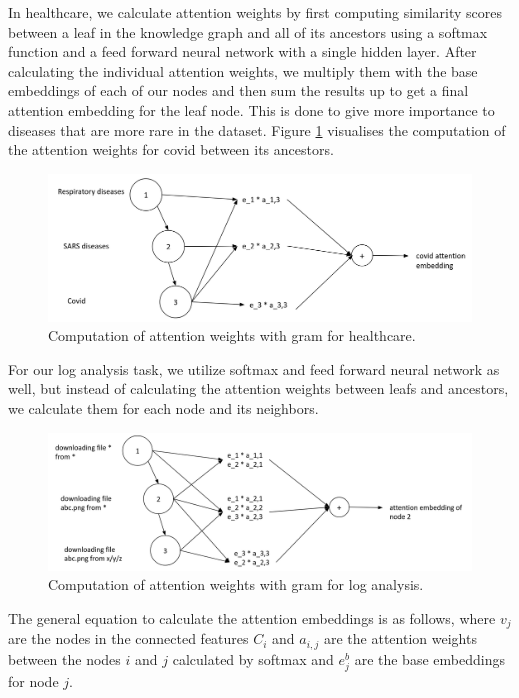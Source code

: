 In healthcare, we calculate attention weights by first computing similarity scores between a leaf in the knowledge graph and all of its ancestors using a softmax function and a feed forward neural network with a single hidden layer. After calculating the individual attention weights, we multiply them with the base embeddings of each of our nodes and then sum the results up to get a final attention embedding for the leaf node. This is done to give more importance to diseases that are more rare in the dataset. Figure \ref{fig:gramAttention} visualises the computation of the attention weights for covid between its ancestors. 

\begin{figure}[H]
    \centering
    \includegraphics[keepaspectratio=true,scale=0.3]{sections/gram_attention.png}
    \caption{Computation of attention weights with gram for healthcare. }
    \label{fig:gramAttention}
\end{figure}

For our log analysis task, we utilize softmax and feed forward neural network as well, but instead of calculating the attention weights between leafs and ancestors, we calculate them for each node and its neighbors. 

\begin{figure}[H]
    \centering
    \includegraphics[keepaspectratio=true,scale=0.3]{figures/4_methods/log_attention.png}
    \caption{Computation of attention weights with gram for log analysis.}
    \label{fig:gramAttentionLogs}
\end{figure}

The general equation to calculate the attention embeddings is as follows, where $v_j$ are the nodes in the connected features $C_i$ and $a_{i,j}$ are the attention weights between the nodes $i$ and $j$ calculated by softmax and $e_j^b$ are the base embeddings for node $j$. 

